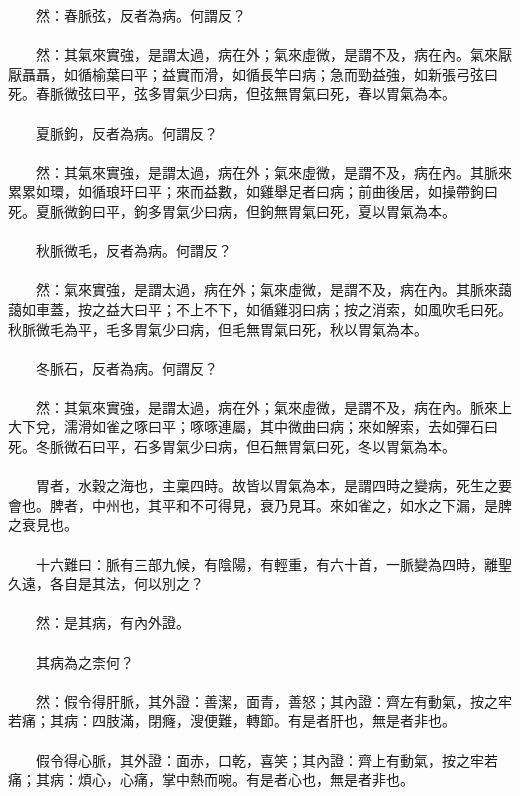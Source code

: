 　　然：春脈弦，反者為病。何謂反？
\\\\
　　然：其氣來實強，是謂太過，病在外；氣來虛微，是謂不及，病在內。氣來厭厭聶聶，如循榆葉曰平；益實而滑，如循長竿曰病；急而勁益強，如新張弓弦曰死。春脈微弦曰平，弦多胃氣少曰病，但弦無胃氣曰死，春以胃氣為本。
\\\\
　　夏脈鉤，反者為病。何謂反？
\\\\
　　然：其氣來實強，是謂太過，病在外；氣來虛微，是謂不及，病在內。其脈來累累如環，如循琅玕曰平；來而益數，如雞舉足者曰病；前曲後居，如操帶鉤曰死。夏脈微鉤曰平，鉤多胃氣少曰病，但鉤無胃氣曰死，夏以胃氣為本。
\\\\
　　秋脈微毛，反者為病。何謂反？
\\\\
　　然：氣來實強，是謂太過，病在外；氣來虛微，是謂不及，病在內。其脈來藹藹如車蓋，按之益大曰平；不上不下，如循雞羽曰病；按之消索，如風吹毛曰死。秋脈微毛為平，毛多胃氣少曰病，但毛無胃氣曰死，秋以胃氣為本。
\\\\
　　冬脈石，反者為病。何謂反？
\\\\
　　然：其氣來實強，是謂太過，病在外；氣來虛微，是謂不及，病在內。脈來上大下兌，濡滑如雀之啄曰平；啄啄連屬，其中微曲曰病；來如解索，去如彈石曰死。冬脈微石曰平，石多胃氣少曰病，但石無胃氣曰死，冬以胃氣為本。
\\\\
　　胃者，水穀之海也，主稟四時。故皆以胃氣為本，是謂四時之變病，死生之要會也。脾者，中州也，其平和不可得見，衰乃見耳。來如雀之，如水之下漏，是脾之衰見也。
\\\\
　　十六難曰：脈有三部九候，有陰陽，有輕重，有六十首，一脈變為四時，離聖久遠，各自是其法，何以別之？
\\\\
　　然：是其病，有內外證。
\\\\
　　其病為之柰何？
\\\\
　　然：假令得肝脈，其外證：善潔，面青，善怒；其內證：齊左有動氣，按之牢若痛；其病：四肢滿，閉癃，溲便難，轉節。有是者肝也，無是者非也。
\\\\
　　假令得心脈，其外證：面赤，口乾，喜笑；其內證：齊上有動氣，按之牢若痛；其病：煩心，心痛，掌中熱而啘。有是者心也，無是者非也。
